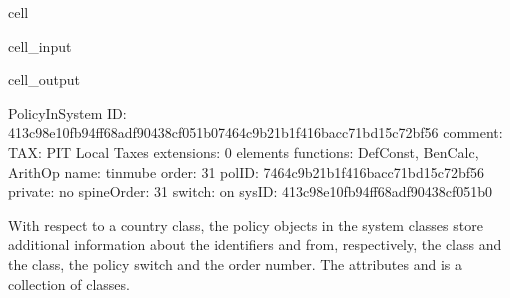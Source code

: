 \documentclass[letterpaper,10pt,english]{sphinxmanual}
\begin{document}
\begin{sphinxuseclass}{cell}
\begin{sphinxuseclass}{cell_input}
\begin{sphinxVerbatim}[commandchars=\\\{\}]
\PYG{p}{[}\PYG{p}{]}\PYG{p}{[}\PYG{p}{]}\PYG{p}{[}\PYG{p}{]}
\end{sphinxVerbatim}

\end{sphinxuseclass}
\begin{sphinxuseclass}{cell_output}
\begin{sphinxVerbatim}[commandchars=\\\{\}]
\PYGZhy{}\PYGZhy{}\PYGZhy{}\PYGZhy{}\PYGZhy{}\PYGZhy{}\PYGZhy{}\PYGZhy{}\PYGZhy{}\PYGZhy{}\PYGZhy{}\PYGZhy{}\PYGZhy{}\PYGZhy{}\PYGZhy{}\PYGZhy{}\PYGZhy{}\PYGZhy{}\PYGZhy{}\PYGZhy{}\PYGZhy{}\PYGZhy{}\PYGZhy{}\PYGZhy{}\PYGZhy{}\PYGZhy{}\PYGZhy{}\PYGZhy{}\PYGZhy{}\PYGZhy{}
PolicyInSystem
\PYGZhy{}\PYGZhy{}\PYGZhy{}\PYGZhy{}\PYGZhy{}\PYGZhy{}\PYGZhy{}\PYGZhy{}\PYGZhy{}\PYGZhy{}\PYGZhy{}\PYGZhy{}\PYGZhy{}\PYGZhy{}\PYGZhy{}\PYGZhy{}\PYGZhy{}\PYGZhy{}\PYGZhy{}\PYGZhy{}\PYGZhy{}\PYGZhy{}\PYGZhy{}\PYGZhy{}\PYGZhy{}\PYGZhy{}\PYGZhy{}\PYGZhy{}\PYGZhy{}\PYGZhy{}
	 ID: \PYGZsq{}413c98e1\PYGZhy{}0fb9\PYGZhy{}4ff6\PYGZhy{}8adf\PYGZhy{}90438cf051b07464c9b2\PYGZhy{}1b1f\PYGZhy{}416b\PYGZhy{}acc7\PYGZhy{}1bd15c72bf56\PYGZsq{}
	 comment: \PYGZsq{}TAX: PIT \PYGZhy{} Local Taxes\PYGZsq{}
	 extensions: 0 elements
	 functions: DefConst, BenCalc, ArithOp
	 name: \PYGZsq{}tinmu\PYGZus{}be\PYGZsq{}
	 order: \PYGZsq{}31\PYGZsq{}
	 polID: \PYGZsq{}7464c9b2\PYGZhy{}1b1f\PYGZhy{}416b\PYGZhy{}acc7\PYGZhy{}1bd15c72bf56\PYGZsq{}
	 private: \PYGZsq{}no\PYGZsq{}
	 spineOrder: \PYGZsq{}31\PYGZsq{}
	 switch: \PYGZsq{}on\PYGZsq{}
	 sysID: \PYGZsq{}413c98e1\PYGZhy{}0fb9\PYGZhy{}4ff6\PYGZhy{}8adf\PYGZhy{}90438cf051b0\PYGZsq{}
\end{sphinxVerbatim}

\end{sphinxuseclass}
\end{sphinxuseclass}
\sphinxAtStartPar
With respect to a country class, the policy objects in the system classes store additional information about the identifiers  and  from, respectively, the  class and the  class, the policy switch and the order number. The attributes  and  is a collection of  classes.
\end{document}
